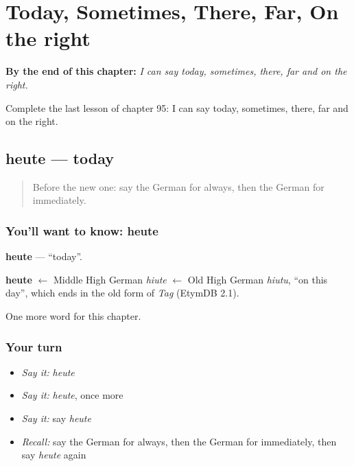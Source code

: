
\chapter{Today, Sometimes, There, Far, On the right}
\label{ch:ge-today-sometimes-there-far-on-the-right}

\begin{chapteropening}
\textbf{By the end of this chapter:} \emph{I can say today, sometimes, there, far and on the right.}

Complete the last lesson of chapter 95: I can say today, sometimes, there, far and on the right.
\end{chapteropening}

\section[heute]{heute — today}

\label{lesson:GE-C95-heute}



\begin{quote}
Before the new one: say the German for always, then the German for immediately.
\end{quote}

\subsection*{You'll want to know: heute}
\textbf{heute} — \textquotedblleft{}today\textquotedblright{}.

\begin{cousinweb}
\textbf{heute} $\leftarrow$ Middle High German \emph{hiute} $\leftarrow$ Old High German \emph{hiutu}, \textquotedblleft{}on this day\textquotedblright{}, which ends in the old form of \emph{Tag} (EtymDB 2.1).
\end{cousinweb}

\begin{grammarlens}[title={What you've built}]
One more word for this chapter.
\end{grammarlens}

\subsection*{Your turn}
\begin{itemize}
\raggedright
  \item \emph{Say it:} \emph{heute}
  \item \emph{Say it:} \emph{heute}, once more
  \item \emph{Say it:} say \emph{heute}
  \item \emph{Recall:} say the German for always, then the German for immediately, then say \emph{heute} again
\end{itemize}

